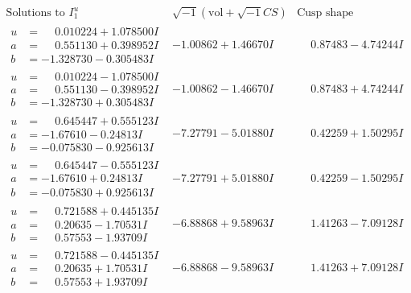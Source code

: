 \documentclass[1p]{elsarticle_modified}
\theoremstyle{definition}
\newcommand{\I}{\sqrt{-1}}
\begin{document}
$$\begin{array}{c|c|c}  
\text{Solutions to }I^u_{1}& \I (\text{vol} + \sqrt{-1}CS) & \text{Cusp shape}\\
 \hline 
\begin{aligned}
u &= \phantom{-}0.010224 + 1.078500 I \\
a &= \phantom{-}0.551130 + 0.398952 I \\
b &= -1.328730 - 0.305483 I\end{aligned}
 & -1.00862 + 1.46670 I & \phantom{-}0.87483 - 4.74244 I \\ \hline\begin{aligned}
u &= \phantom{-}0.010224 - 1.078500 I \\
a &= \phantom{-}0.551130 - 0.398952 I \\
b &= -1.328730 + 0.305483 I\end{aligned}
 & -1.00862 - 1.46670 I & \phantom{-}0.87483 + 4.74244 I \\ \hline\begin{aligned}
u &= \phantom{-}0.645447 + 0.555123 I \\
a &= -1.67610 - 0.24813 I \\
b &= -0.075830 - 0.925613 I\end{aligned}
 & -7.27791 - 5.01880 I & \phantom{-}0.42259 + 1.50295 I \\ \hline\begin{aligned}
u &= \phantom{-}0.645447 - 0.555123 I \\
a &= -1.67610 + 0.24813 I \\
b &= -0.075830 + 0.925613 I\end{aligned}
 & -7.27791 + 5.01880 I & \phantom{-}0.42259 - 1.50295 I \\ \hline\begin{aligned}
u &= \phantom{-}0.721588 + 0.445135 I \\
a &= \phantom{-}0.20635 - 1.70531 I \\
b &= \phantom{-}0.57553 - 1.93709 I\end{aligned}
 & -6.88868 + 9.58963 I & \phantom{-}1.41263 - 7.09128 I \\ \hline\begin{aligned}
u &= \phantom{-}0.721588 - 0.445135 I \\
a &= \phantom{-}0.20635 + 1.70531 I \\
b &= \phantom{-}0.57553 + 1.93709 I\end{aligned}
 & -6.88868 - 9.58963 I & \phantom{-}1.41263 + 7.09128 I \\ \hline\begin{aligned}

\end{aligned}
\end{array}$$
\end{document}
